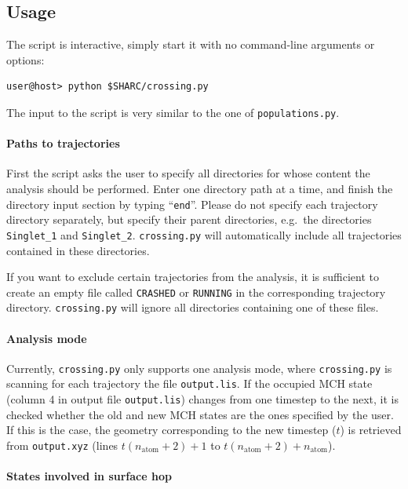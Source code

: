 \documentclass[a4paper,11pt,DIV=15,openany,twoside=false]{scrbook}
\newcommand{\ttt}[1]{\texttt{#1}}
\begin{document}
\subsection{Usage}

The script is interactive, simply start it with no command-line arguments or options:
\begin{verbatim}
user@host> python $SHARC/crossing.py
\end{verbatim}

The input to the script is very similar to the one of \ttt{populations.py}. 

\paragraph{Paths to trajectories}

First the script asks the user to specify all directories for whose content the analysis should be performed. Enter one directory path at a time, and finish the directory input section by typing ``\ttt{end}''. Please do not specify each trajectory directory separately, but specify their parent directories, e.g.\ the directories \ttt{Singlet\_1} and \ttt{Singlet\_2}. \ttt{crossing.py} will automatically include all trajectories contained in these directories.

If you want to exclude certain trajectories from the analysis, it is sufficient to create an empty file called \ttt{CRASHED} or \ttt{RUNNING} in the corresponding trajectory directory. \ttt{crossing.py} will ignore all directories containing one of these files.

\paragraph{Analysis mode}

Currently, \ttt{crossing.py} only supports one analysis mode, where \ttt{crossing.py} is scanning for each trajectory the file \ttt{output.lis}. If the occupied MCH state (column 4 in output file \ttt{output.lis}) changes from one timestep to the next, it is checked whether the old and new MCH states are the ones specified by the user. If this is the case, the geometry corresponding to the new timestep ($t$) is retrieved from \ttt{output.xyz} (lines $t(n_{\text{atom}}+2)+1$ to $t(n_{\text{atom}}+2)+n_{\text{atom}}$). 

\paragraph{States involved in surface hop}
\end{document}
